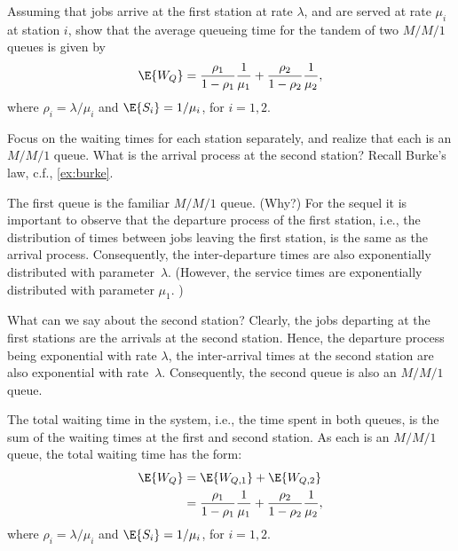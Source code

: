 \begin{exercise}
Assuming that jobs arrive at the first station at rate $\lambda$, and are served at rate $\mu_i$ at station $i$, show that the average queueing time for the tandem of two $M/M/1$ queues is given by
\begin{equation}
\E{W_Q}  = \frac{\rho_1}{1-\rho_1} \frac1{\mu_1} + \frac{\rho_2}{1-\rho_2} \frac1{\mu_2},
\end{equation}
where $\rho_i = \lambda/\mu_i$ and $\E{S_i} = 1/\mu_i$, for $i=1,2$. 
\begin{hint}
Focus on the waiting times for each station separately, and realize that each is an $M/M/1$ queue. What is the arrival process at the second station? Recall Burke's law, c.f., \ref{ex:burke}.
\end{hint}
\begin{solution}
The first queue is the familiar $M/M/1$ queue.  (Why?) For the sequel
it is important to observe that the departure process of the first
station, i.e., the distribution of times between jobs leaving the
first station, is the same as the arrival process. Consequently, the
inter-departure times are also exponentially distributed with parameter~$\lambda$. (However, the service times are exponentially distributed
with parameter $\mu_1$. ) 

What can we say about the second station?  Clearly, the jobs departing
at the first stations are the arrivals at the second station. Hence,
the departure process being exponential with rate $\lambda$, the
inter-arrival times at the second station are also exponential with
rate~$\lambda$. Consequently, the second queue is also an $M/M/1$
queue.

The total waiting time in the
system, i.e., the time spent in both queues, is the sum of the waiting
times at the first and second station. As each is an $M/M/1$ queue,
the total waiting time has the form:
\begin{equation}
  \begin{split}
\E{W_Q}  &= \E{W_{Q,1}} + \E{W_{Q,2}} \\
&= \frac{\rho_1}{1-\rho_1} \frac1{\mu_1} + \frac{\rho_2}{1-\rho_2} \frac1{\mu_2},
  \end{split}
\end{equation}
where $\rho_i = \lambda/\mu_i$ and $\E{S_i} = 1/\mu_i$, for $i=1,2$. 
\end{solution}
\end{exercise}


